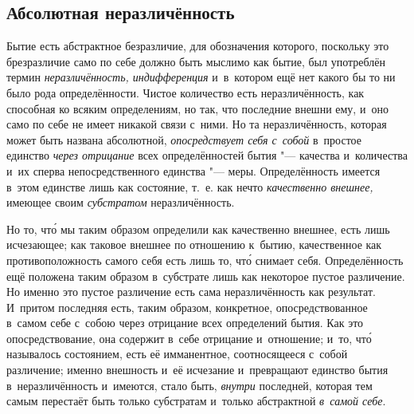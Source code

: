 \subsection{Абсолютная неразличённость}

Бытие есть абстрактное безразличие, для обозначения которого, поскольку это
брезразличие само по себе должно быть мыслимо как бытие, был употреблён
термин {\em неразличённость, индифференция}
и~в~котором ещё нет какого бы то ни было рода определённости. Чистое количество
есть неразличённость, как способная ко всяким определениям, но так, что
последние внешни ему, и~оно само по себе не имеет никакой связи с~ними. Но та
неразличённость, которая может быть названа абсолютной, {\em опосредствует себя
с~собой} в~простое единство {\em через отрицание} всех определённостей бытия
"--- качества и~количества и~их сперва непосредственного единства "--- меры.
Определённость имеется в~этом единстве лишь как состояние, т.~е. как нечто
{\em качественно внешнее,} имеющее своим {\em субстратом} неразличённость.

Но то, чт\'{о} мы таким образом определили как качественно внешнее, есть лишь
исчезающее; как таковое внешнее по отношению к~бытию, качественное как
противоположность самого себя есть лишь то, чт\'{о} снимает себя.
Определённость ещё положена таким образом в~субстрате лишь как некоторое пустое
различение. Но именно это пустое различение есть сама неразличённость
как результат. И~притом последняя есть, таким образом, конкретное,
опосредствованное в~самом себе с~собою через отрицание всех определений бытия.
Как это опосредствование, она содержит в~себе отрицание и~отношение; и~то,
чт\'{о} называлось состоянием, есть её имманентное, соотносящееся с~собой
различение; именно внешность и~её исчезание и~превращают единство бытия
в~неразличённость и~имеются, стало быть, {\em внутри} последней, которая тем
самым перестаёт быть только субстратам и~только абстрактной {\em в~самой себе}.

